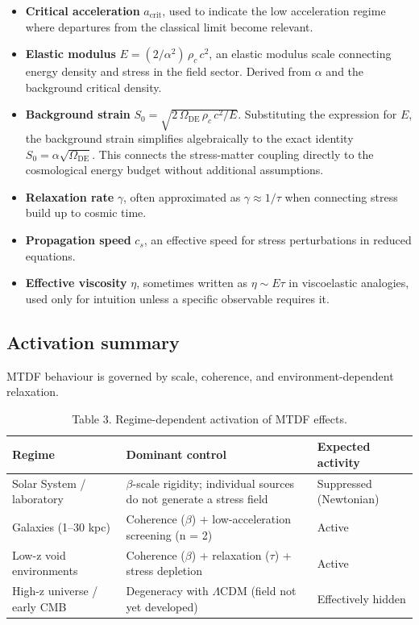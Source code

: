 \documentclass[11pt,a4paper]{article}
\begin{document}
\begin{itemize}
  \item \textbf{Critical acceleration} \(a_\mathrm{crit}\), used to indicate the low acceleration regime where departures from the classical limit become relevant.
  \item \textbf{Elastic modulus} \(E = (2/\alpha^2)\,\rho_c\,c^2\), an elastic modulus scale connecting energy density and stress in the field sector. Derived from $\alpha$ and the background critical density.
  \item \textbf{Background strain} \(S_0 = \sqrt{2\,\Omega_\mathrm{DE}\,\rho_c\,c^2/E}\). Substituting the expression for \(E\), the background strain simplifies algebraically to the exact identity \(S_0 = \alpha\sqrt{\Omega_\mathrm{DE}}\). This connects the stress-matter coupling directly to the cosmological energy budget without additional assumptions.
  \item \textbf{Relaxation rate} \(\gamma\), often approximated as \(\gamma \approx 1/\tau\) when connecting stress build up to cosmic time.
  \item \textbf{Propagation speed} \(c_s\), an effective speed for stress perturbations in reduced equations.
  \item \textbf{Effective viscosity} \(\eta\), sometimes written as \(\eta \sim E\tau\) in viscoelastic analogies, used only for intuition unless a specific observable requires it.
\end{itemize}

\subsection{Activation summary}
MTDF behaviour is governed by scale, coherence, and environment-dependent relaxation.

\begin{table}[H]
\centering
\footnotesize
\caption{Table 3. Regime-dependent activation of MTDF effects.}
\begin{tabularx}{\linewidth}{l>{\RaggedRight\arraybackslash}X>{\RaggedRight\arraybackslash}X}
\toprule
\textbf{Regime} & \textbf{Dominant control} & \textbf{Expected activity} \tabularnewline
\midrule
Solar System / laboratory & $\beta$-scale rigidity; individual sources do not generate a stress field & Suppressed (Newtonian) \tabularnewline
Galaxies (1--30 kpc) & Coherence ($\beta$) + low-acceleration screening (n = 2) & Active \tabularnewline
Low-z void environments & Coherence ($\beta$) + relaxation ($\tau$) + stress depletion & Active \tabularnewline
High-z universe / early CMB & Degeneracy with $\Lambda$CDM (field not yet developed) & Effectively hidden \tabularnewline
\bottomrule
\end{tabularx}
\end{table}
\end{document}
